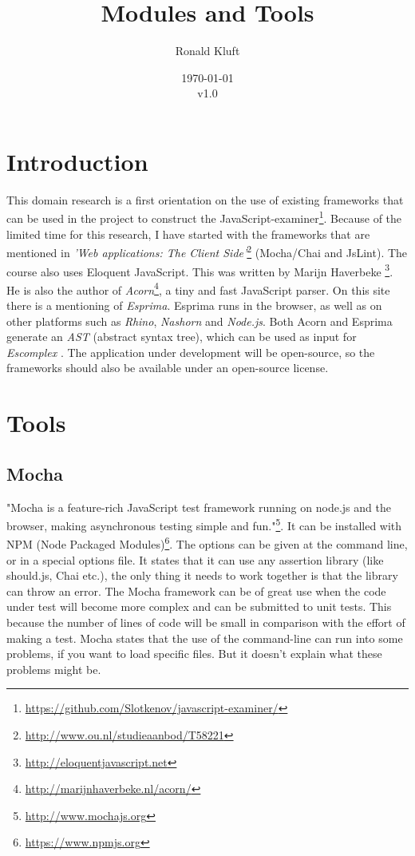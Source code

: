 \documentclass{article}
\begin{document}
\title{Modules and Tools}
\author{Ronald Kluft}
\date{\today\\v1.0}
\maketitle

\section{Introduction}
This domain research is a first orientation on the use of existing frameworks that can be used in the 
project to construct the JavaScript-examiner\footnote{\url{https://github.com/Slotkenov/javascript-examiner/}}.
Because of the limited time for this research, I have started with the frameworks that are mentioned in 
{\em'Web applications: The Client Side'}\footnote{\url{http://www.ou.nl/studieaanbod/T58221}} (Mocha/Chai and JsLint).
The course also uses Eloquent JavaScript. This was written by Marijn Haverbeke \footnote{\url{http://eloquentjavascript.net}}.
He is also the author of {\em Acorn}\footnote{\url{http://marijnhaverbeke.nl/acorn/}}, a tiny and fast JavaScript parser.
On this site there is a mentioning of {\em Esprima}. 
Esprima runs in the browser, as well as on other platforms such as {\em Rhino}, {\em Nashorn} and {\em Node.js}.
Both Acorn and Esprima generate an {\em AST} (abstract syntax tree), which can be used as input for {\em Escomplex }.
The application under development will be open-source, so the frameworks should also be available
under an open-source license.

\section{Tools}

\subsection{Mocha}
"Mocha is a feature-rich JavaScript test framework running on node.js and the 
browser, making asynchronous testing simple and fun."\footnote{\url{http://www.mochajs.org}}.
It can be installed with NPM (Node Packaged Modules)\footnote{\url{https://www.npmjs.org}}.
The options can be given at the command line, or in a special options file.
It states that it can use any assertion library (like should.js, Chai etc.), 
the only thing it needs to work together is that the library can throw an error.
The Mocha framework can be of great use when the code under test will become more complex and can be submitted to unit tests.
This because the number of lines of code will be small in comparison with the effort of making a test.
Mocha states that the use of the command-line can run into some problems, if you want to load specific files. 
But it doesn't explain what these problems might be.
\end{document}
